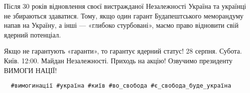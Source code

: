 Після 30 років відновлення своєї вистражданої Незалежності Україна та українці
не збираються здаватися. Тому, якщо один гарант Будапештського меморандуму
напав на Україну, а інші — «глибоко стурбовані», маємо право відновити свій
ядерний потенціал.

\obeycr
Якщо не гарантують «гаранти», то гарантує ядерний статус!
28 серпня. 
Субота. 
Київ. 
12:00. 
Майдан Незалежності. 
Приходь на акцію! 
Озвучимо президенту ВИМОГИ НАЦІЇ!
\restorecr

\begin{verbatim}
  #вимогинації #україна #київ #во_свобода #є_свобода_буде_україна
\end{verbatim}

